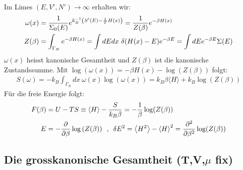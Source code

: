 \vspace{-10pt}

Im Limes $(E,V',N') \rightarrow \infty$ erhalten wir:
\begin{align*}
    \omega(x) &= \frac{1}{\Sigma_0(E)} e^{k_B^{-1} \left( S'(E) - \frac{1}{T} H(x) \right)}
    = \frac{1}{Z(\beta)} e^{-\beta H(x)}
    \\
    Z(\beta) &= \int_{\Gamma_N} e^{-\beta H(x)}
    = \int dE dx \ \delta(H(x)-E) e^{-\beta E}
    = \int dE e^{-\beta E} \Sigma(E)
\end{align*}
$\omega(x)$ heisst kanonische Gesamtheit und $Z(\beta)$ ist die kanonische
Zustandssumme. Mit $\log(\omega(x)) = - \beta H(x) - \log(Z(\beta))$ folgt:
\begin{align*}
    S(\omega) = - k_B \int_{\Gamma_N} dx \ \omega(x) \log(\omega(x))
    = k_B \beta \langle H \rangle + k_B \log(Z(\beta))
\end{align*}
Für die freie Energie folgt:
\begin{align*}
    F(\beta) &= U - T S \equiv \langle H \rangle - \frac{S}{k_B \beta}
    = - \frac{1}{\beta} \log(Z(\beta))
    \\
    E &= - \frac{\partial}{\partial \beta} \log \left( Z(\beta) \right)
    \hspace{5pt} , \hspace{5pt}
    \delta E^2 = \left\langle H^2 \right\rangle - \left\langle H \right\rangle^2
        = \frac{\partial^2}{\partial \beta^2} \log(Z(\beta))
\end{align*}

\vspace{-15pt}

\subsection{Die grosskanonische Gesamtheit (T,V,$\mu$ fix)}

